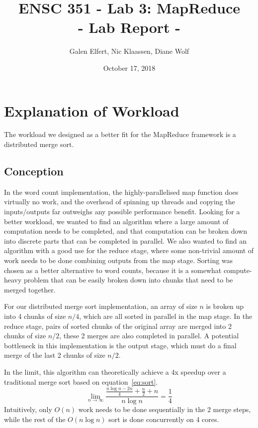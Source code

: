 \documentclass[12pt, letterpaper]{article}
\begin{document}
\title{ENSC 351 - Lab 3: MapReduce\\ \large{- Lab Report -}}
\date{October 17, 2018}
\author{Galen Elfert, Nic Klaassen, Diane Wolf}
\maketitle
\section{Explanation of Workload}
	The workload we designed as a better fit for the MapReduce framework is a distributed merge sort.

\subsection{Conception}
	In the word count implementation, the highly-parallelised map function does virtually no work, and the overhead of spinning up threads and copying the inputs/outputs far outweighs any possible performance benefit.
	Looking for a better workload, we wanted to find an algorithm where a large amount of computation needs to be completed, and that computation can be broken down into discrete parts that can be completed in parallel.
	We also wanted to find an algorithm with a good use for the reduce stage, where some non-trivial amount of work needs to be done combining outputs from the map stage.
	Sorting was chosen as a better alternative to word counts, because it is a somewhat compute-heavy problem that can be easily broken down into chunks that need to be merged together.

	For our distributed merge sort implementation, an array of size $ n $ is broken up into 4 chunks of size $ n/4 $, which are all sorted in parallel in the map stage.
	In the reduce stage, pairs of sorted chunks of the original array are merged into 2 chunks of size $ n/2 $, these 2 merges are also completed in parallel.
	A potential bottleneck in this implementation is the output stage, which must do a final merge of the last 2 chunks of size $ n/2 $.

	In the limit, this algorithm can theoretically achieve a 4x speedup over a traditional merge sort based on equation~\ref{eq:sort}.
	\begin{equation} \label{eq:sort}
	\lim_{n\to\infty} \frac{\frac{n\log{n} - 2n}{4} + \frac{n}{2} + n}{n\log{n}} = \frac{1}{4}
	\end{equation}
	Intuitively, only $O(n)$ work needs to be done sequentially in the 2 merge steps, while the rest of the $O(n\log{n})$ sort is done concurrently on 4 cores.
\end{document}
